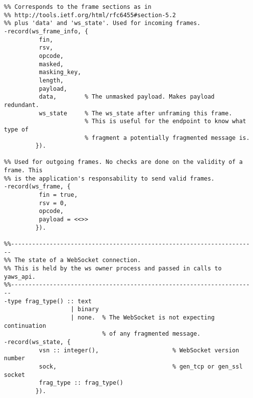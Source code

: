 \documentclass[11pt,oneside,english]{book}
\begin{document}
\begin{verbatim}
%% Corresponds to the frame sections as in
%% http://tools.ietf.org/html/rfc6455#section-5.2
%% plus 'data' and 'ws_state'. Used for incoming frames.
-record(ws_frame_info, {
          fin,
          rsv,
          opcode,
          masked,
          masking_key,
          length,
          payload,
          data,        % The unmasked payload. Makes payload redundant.
          ws_state     % The ws_state after unframing this frame.
                       % This is useful for the endpoint to know what type of
                       % fragment a potentially fragmented message is.
         }).

%% Used for outgoing frames. No checks are done on the validity of a frame. This
%% is the application's responsability to send valid frames.
-record(ws_frame, {
          fin = true,
          rsv = 0,
          opcode,
          payload = <<>>
         }).

%%----------------------------------------------------------------------
%% The state of a WebSocket connection.
%% This is held by the ws owner process and passed in calls to yaws_api.
%%----------------------------------------------------------------------
-type frag_type() :: text
                   | binary
                   | none.  % The WebSocket is not expecting continuation
                            % of any fragmented message.
-record(ws_state, {
          vsn :: integer(),                     % WebSocket version number
          sock,                                 % gen_tcp or gen_ssl socket
          frag_type :: frag_type()
         }).
\end{verbatim}
\end{document}
